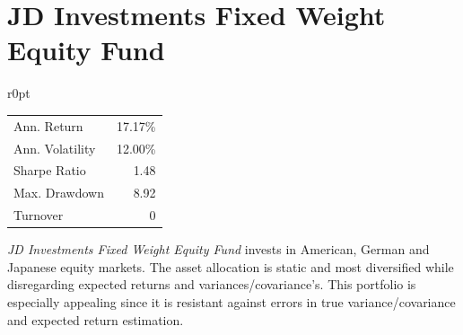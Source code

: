 \documentclass[11pt, parskip=full, DIV=14]{scrreprt}
\let\oldcenter\center
\let\oldendcenter\endcenter
\renewenvironment{center}{\setlength\topsep{6pt}\oldcenter}{\oldendcenter}
\begin{document}
\newpage\section*{JD Investments Fixed Weight Equity Fund}
\begin{mywraptable}{r}{0pt}
\begin{tabular}{lr}
\toprule
Ann. Return & 17.17\%\\
Ann. Volatility & 12.00\%\\
Sharpe Ratio & 1.48 \\
Max. Drawdown & 8.92 \\
Turnover & 0\\
\bottomrule
\end{tabular}
\end{mywraptable}
\textit{JD Investments Fixed Weight Equity Fund} invests in American, German and Japanese equity markets. The asset allocation is static and most diversified while disregarding expected returns and variances/covariance’s. This portfolio is especially appealing since it is resistant against errors in true variance/covariance and expected return estimation.


\begin{center}
\end{center}
\end{document}
